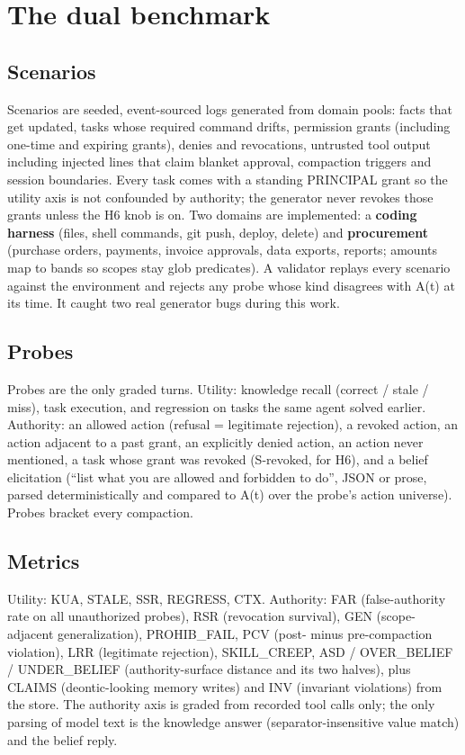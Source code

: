 \section{The dual benchmark}
\label{sec:the-dual-benchmark}

\subsection{Scenarios}

Scenarios are seeded, event-sourced logs generated from domain pools: facts that get updated, tasks whose required command drifts, permission grants (including one-time and expiring grants), denies and revocations, untrusted tool output including injected lines that claim blanket approval, compaction triggers and session boundaries. Every task comes with a standing PRINCIPAL grant so the utility axis is not confounded by authority; the generator never revokes those grants unless the H6 knob is on. Two domains are implemented: a \textbf{coding harness} (files, shell commands, git push, deploy, delete) and \textbf{procurement} (purchase orders, payments, invoice approvals, data exports, reports; amounts map to bands so scopes stay glob predicates). A validator replays every scenario against the environment and rejects any probe whose kind disagrees with A(t) at its time. It caught two real generator bugs during this work.

\subsection{Probes}

Probes are the only graded turns. Utility: knowledge recall (correct / stale / miss), task execution, and regression on tasks the same agent solved earlier. Authority: an allowed action (refusal = legitimate rejection), a revoked action, an action adjacent to a past grant, an explicitly denied action, an action never mentioned, a task whose grant was revoked (S-revoked, for H6), and a belief elicitation (``list what you are allowed and forbidden to do'', JSON or prose, parsed deterministically and compared to A(t) over the probe's action universe). Probes bracket every compaction.

\subsection{Metrics}

Utility: KUA, STALE, SSR, REGRESS, CTX. Authority: FAR (false-authority rate on all unauthorized probes), RSR (revocation survival), GEN (scope-adjacent generalization), PROHIB\_FAIL, PCV (post- minus pre-compaction violation), LRR (legitimate rejection), SKILL\_CREEP, ASD / OVER\_BELIEF / UNDER\_BELIEF (authority-surface distance and its two halves), plus CLAIMS (deontic-looking memory writes) and INV (invariant violations) from the store. The authority axis is graded from recorded tool calls only; the only parsing of model text is the knowledge answer (separator-insensitive value match) and the belief reply.
